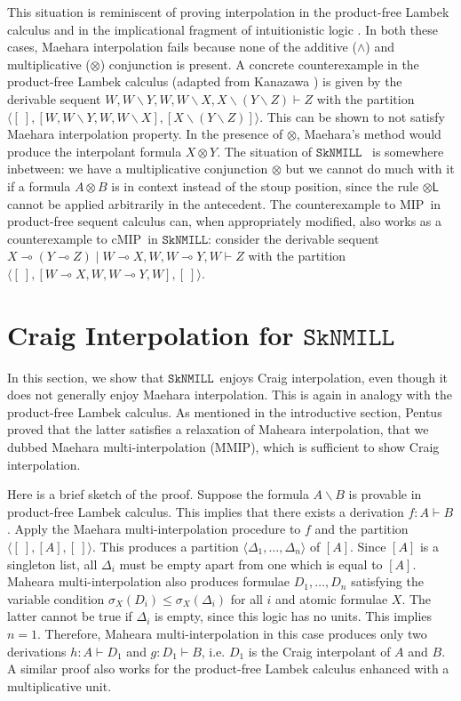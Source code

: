 \documentclass[sn-mathphys-num]{sn-jnl}%
\newcommand{\vd}{\vdash}
\newcommand{\tl}{\otimes \mathsf{L}}
\newcommand{\ot}{\otimes}
\newcommand{\lolli}{\multimap}
\newcommand{\bsls}{\backslash}
\newcommand{\SkNMILL}{$\mathtt{SkNMILL}$}
\newcommand{\MIP}{\textsf{MIP}}
\newcommand{\MMIP}{\textsf{MMIP}}
\newcommand{\cMIP}{\textsf{cMIP}}
\theoremstyle{thmstyleone}%
\theoremstyle{thmstyletwo}%
\theoremstyle{thmstylethree}%
\begin{document}
This situation is reminiscent of proving interpolation in the product-free Lambek calculus \cite{Pentus1997} and in the implicational fragment of intuitionistic logic \cite{Kanazawa2006}.
In both these cases, Maehara interpolation fails because none of the additive ($\land$) and multiplicative ($\ot$) conjunction is present.
A concrete counterexample in the product-free Lambek calculus (adapted from Kanazawa \cite{Kanazawa2006}) is given by the derivable sequent $W, W\bsls Y, W , W \bsls X , X \bsls (Y \bsls Z) \vd Z$ with the partition $\langle [\ ] , [W, W\bsls Y, W , W \bsls X], [X \bsls (Y \bsls Z)] \rangle$. This can be shown to not satisfy Maehara interpolation property. In the presence of $\ot$,  Maehara's method would produce the interpolant formula $X \ot Y$. The situation of \SkNMILL~ is somewhere inbetween: we have a multiplicative conjunction $\ot$ but we cannot do much with it if a formula $A \ot B$ is in context instead of the stoup position, since the rule $\tl$ cannot be applied arbitrarily in the antecedent.
The counterexample to \MIP~in product-free sequent calculus can, when appropriately modified, also works as a counterexample to \cMIP~in \SkNMILL: consider the derivable sequent  $X \lolli (Y \lolli Z) \mid W \lolli X, W , W \lolli Y, W \vd Z$ with the partition $\langle [\ ] , [W \lolli X, W , W \lolli Y, W], [\ ] \rangle$.

\section{Craig Interpolation for \SkNMILL}\label{sec:interpolation}

In this section, we show that \SkNMILL~enjoys Craig interpolation, even though it does not generally enjoy Maehara interpolation.
This is again in analogy with the product-free Lambek calculus. 
As mentioned in the introductive section, Pentus \cite{Pentus1997} proved that the latter satisfies a relaxation of Maheara interpolation, that we dubbed Maehara multi-interpolation (\MMIP), which is sufficient to show Craig interpolation. 

Here is a brief sketch of the proof. 
Suppose the formula $A \bsls B$ is provable in product-free Lambek calculus.
This implies that there exists a derivation $f : A \vd B$.
Apply the Maehara multi-interpolation procedure to $f$ and the partition $\langle [\ ],[A],[\ ]\rangle$.
This produces a partition $\langle \Delta_1,\dots,\Delta_n \rangle$ of $[A]$.
Since $[A]$ is a singleton list, all $\Delta_i$ must be empty apart from one which is equal to $[A]$.
Maheara multi-interpolation also produces formulae $D_1,\dots,D_n$ satisfying the variable condition $\sigma_X(D_i) \leq \sigma_X(\Delta_i)$ for all $i$ and atomic formulae $X$. 
The latter cannot be true if $\Delta_i$ is empty, since this logic has no units.
This implies $n = 1$.
Therefore, Maheara multi-interpolation in this case produces only two derivations $h : A \vd D_1$ and $g : D_1 \vd B$, i.e. $D_1$ is the Craig interpolant of $A$ and $B$.
A similar proof also works for the product-free Lambek calculus enhanced with a multiplicative unit.
\end{document}
